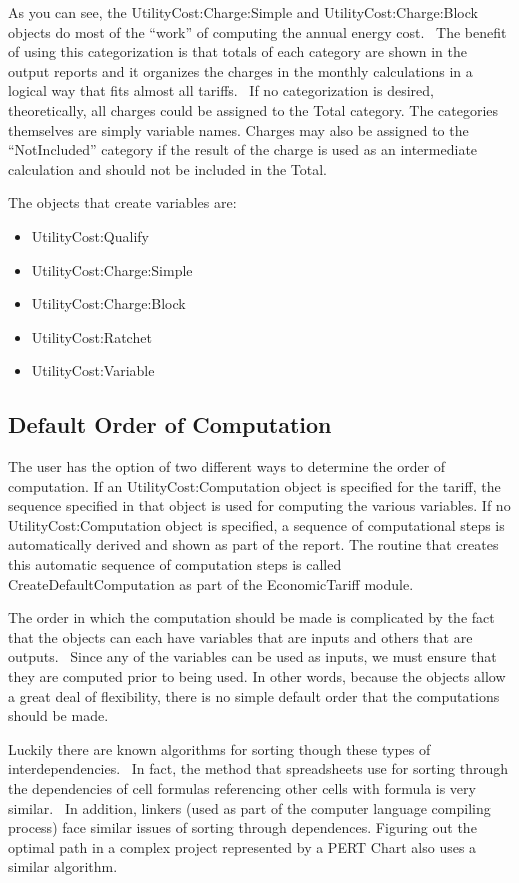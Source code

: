 As you can see, the UtilityCost:Charge:Simple and UtilityCost:Charge:Block objects do most of the ``work'' of computing the annual energy cost.~ The benefit of using this categorization is that totals of each category are shown in the output reports and it organizes the charges in the monthly calculations in a logical way that fits almost all tariffs.~ If no categorization is desired, theoretically, all charges could be assigned to the Total category. The categories themselves are simply variable names. Charges may also be assigned to the ``NotIncluded'' category if the result of the charge is used as an intermediate calculation and should not be included in the Total.

The objects that create variables are:

\begin{itemize}
\item
  UtilityCost:Qualify
\item
  UtilityCost:Charge:Simple
\item
  UtilityCost:Charge:Block
\item
  UtilityCost:Ratchet
\item
  UtilityCost:Variable
\end{itemize}

\subsection{Default Order of Computation}\label{default-order-of-computation}

The user has the option of two different ways to determine the order of computation. If an UtilityCost:Computation object is specified for the tariff, the sequence specified in that object is used for computing the various variables. If no UtilityCost:Computation object is specified, a sequence of computational steps is automatically derived and shown as part of the report. The routine that creates this automatic sequence of computation steps is called CreateDefaultComputation as part of the EconomicTariff module.

The order in which the computation should be made is complicated by the fact that the objects can each have variables that are inputs and others that are outputs.~ Since any of the variables can be used as inputs, we must ensure that they are computed prior to being used. In other words, because the objects allow a great deal of flexibility, there is no simple default order that the computations should be made.

Luckily there are known algorithms for sorting though these types of interdependencies.~ In fact, the method that spreadsheets use for sorting through the dependencies of cell formulas referencing other cells with formula is very similar.~ In addition, linkers (used as part of the computer language compiling process) face similar issues of sorting through dependences. Figuring out the optimal path in a complex project represented by a PERT Chart also uses a similar algorithm.


